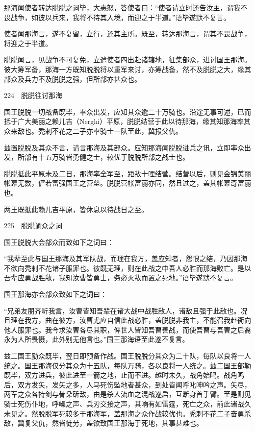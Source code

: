 \documentclass[12pt,UTF8]{ctexbook}
\begin{document}
那海闻使者转达脱脱之词毕，大恚怒，答使者曰：“使者请立时还告汝主，谓我不畏战争，如彼以兵来，我将不待其入境，而迎之于半道。”语毕遂默不复言。

使者闻那海言，遂不复留，立行，还其主所。既至，转达那海言，谓其不畏战争，将迎之于半道。

脱脱闻言，见战争不可复免，立遣使者四出赴诸辖地，征集部众，进讨国王那海。彼大筹军备，那海一方既知脱脱将以重军来讨，亦筹战备，然不及脱脱之大，缘其部众及兵力不及脱脱之强，但所部亦甚众也。





224　脱脱往讨那海

国王脱脱一切战备既毕，率众出发，应知其众逾二十万骑也。沿途无事可述，已而抵于广大美丽之赖儿吉（Nerghi）平原，脱脱结营于此以待那海，缘其知那海率其众来敌也。秃剌不花之二子亦率骑士一队至此，冀报父仇。

兹置脱脱及其众不言，请言那海及其部众。应知那海闻脱脱进兵之讯，立即率众出发，所部有十五万骑皆勇健之士，较优于脱脱所部之战士也。

脱脱抵此平原未及二日，那海率全军至，距敌十哩结营。结营以后，则见金锦美丽帐幕无数，俨若富强国王之营垒。脱脱营帐富丽亦同，然且过之，盖其帐幕奇富丽也。

两王既抵此赖儿吉平原，皆休息以待战日之至。





225　脱脱谕众之词

国王脱脱大会部众而致如下之词曰：

“我辈至此与国王那海及其军队战，而理在我方，盖应知者，怨恨之结，乃因那海不欲向秃剌不花诸子服罪也。彼既无理，则在此战之中吾人必胜而那海败亡。是以吾辈应勇战胜敌，我知汝曹皆勇士，务必灭敌而置之死地。”语毕遂默不复言。

国王那海亦会部众致如下之词曰：

“兄弟友朋齐听我言，汝曹皆知吾辈在诸大战中战胜敌人，诸敌且强于此敌也。况且理在我方，曲在彼方，汝曹尤应自信此战必胜，盖脱脱非我主，不能召我赴衙向他人服罪也。我今求汝曹各尽其职，俾世人皆知吾曹善战，而使吾曹与吾曹之后裔永为人所畏慑，此外别无他言也。”国王那海语至此遂不复言。

兹二国王励众既毕，翌日即预备作战。国王脱脱分其众为二十队，每队以良将一人统之。国王那海仅分其众为十五队，每队万骑，各以良将一人统之。兹二国王部勒既毕，双方进兵，彼此进至一箭之地，止而不进。越时未久，战角始鸣。战角鸣后，双方发矢，发矢之多，人马死伤坠地者甚众，到处皆闻呼叱呻吟之声。矢尽，两军之众各持剑与骨朵斫敌，由是杀人流血之混战遂启，互断身首手臂。至是则见骑士死伤仆地，呼噪之声、兵刃交接之声，其响有如雷霆，死亡之众，前此诸战久未见之。然脱脱军死较多于那海军，盖那海之众作战较优也。秃剌不花二子奋勇杀敌，冀复父仇，然皆徒劳，盖欲致国王那海于死地，其事甚难也。
\end{document}
